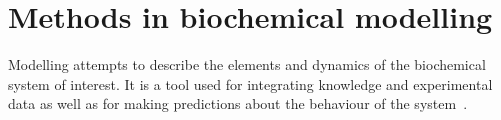 

\section{Methods in biochemical modelling}

Modelling attempts to describe the elements and dynamics of the biochemical system of interest. It is a tool used for integrating knowledge and experimental data as well as for making predictions about the behaviour of the system~\autocite{Wilkinson:2006td}. 



